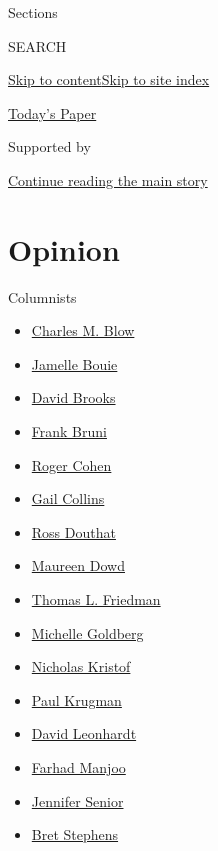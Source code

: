 Sections

SEARCH

\protect\hyperlink{site-content}{Skip to
content}\protect\hyperlink{site-index}{Skip to site index}

\href{https://myaccount.nytimes3xbfgragh.onion/auth/login?response_type=cookie\&client_id=vi}{}

\href{https://www.nytimes3xbfgragh.onion/section/todayspaper}{Today's
Paper}

Supported by

\protect\hyperlink{after-sponsor}{Continue reading the main story}

\hypertarget{opinion}{%
\section{Opinion}\label{opinion}}

Columnists

\begin{itemize}
\tightlist
\item
  \href{/column/charles-m-blow}{Charles M. Blow}
\item
  \href{/column/jamelle-bouie}{Jamelle Bouie}
\item
  \href{/column/david-brooks}{David Brooks}
\item
  \href{/column/frank-bruni}{Frank Bruni}
\item
  \href{/column/roger-cohen}{Roger Cohen}
\item
  \href{/column/gail-collins}{Gail Collins}
\item
  \href{/column/ross-douthat}{Ross Douthat}
\item
  \href{/column/maureen-dowd}{Maureen Dowd}
\item
  \href{/column/thomas-l-friedman}{Thomas L. Friedman}
\item
  \href{/column/michelle-goldberg}{Michelle Goldberg}
\item
  \href{/column/nicholas-kristof}{Nicholas Kristof}
\item
  \href{/column/paul-krugman}{Paul Krugman}
\item
  \href{/column/david-leonhardt}{David Leonhardt}
\item
  \href{/column/farhad-manjoo}{Farhad Manjoo}
\item
  \href{/column/jennifer-senior}{Jennifer Senior}
\item
  \href{/column/bret-stephens}{Bret Stephens}
\end{itemize}

